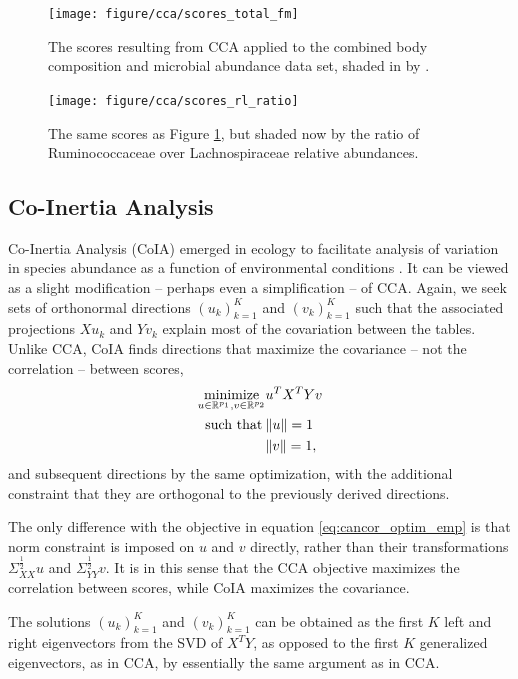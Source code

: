 \documentclass{article}
\begin{document}
\begin{figure}[ht]
  \centering
  \texttt{[image: figure/cca/scores\_total\_fm]}
  \caption{The scores resulting from CCA applied to the combined body
    composition and microbial abundance data set, shaded in by
    .\label{fig:cca_scores_total_fm} }
\end{figure}

\begin{figure}[ht]
  \centering
  \texttt{[image: figure/cca/scores\_rl\_ratio]}
  \caption{The same scores as Figure \ref{fig:cca_scores_total_fm}, but shaded now by
    the ratio of Ruminococcaceae over Lachnospiraceae relative
    abundances. \label{fig:cca_scores_rl_ratio} }
\end{figure}

\subsection{Co-Inertia Analysis}

Co-Inertia Analysis (CoIA) emerged in ecology to facilitate analysis of
variation in species abundance as a function of environmental conditions
\cite{doledec1994co}. It can be viewed as a slight modification -- perhaps even
a simplification -- of CCA. Again, we seek sets of orthonormal directions
$\left(u_{k}\right)_{k = 1}^{K}$ and $\left(v_{k}\right)_{k = 1}^{K}$ such that
the associated projections $Xu_{k}$ and $Yv_{k}$ explain most of the covariation
between the tables. Unlike CCA, CoIA finds directions that maximize the
covariance -- not the correlation -- between scores,
\begin{align*}
\mathop\mathrm{minimize}_{u \in \mathbb{R}^{p_{1}}, v \in \mathbb{R}^{p_{2}}} &u^{T}X^{T}Yv \\
\text{ such that}\medspace &\|u\| = 1\\
&\|v\| = 1,
\end{align*}
and subsequent directions by the same optimization, with the
additional constraint that they are orthogonal to the previously
derived directions.

The only difference with the objective in equation \ref{eq:cancor_optim_emp} is
that norm constraint is imposed on $u$ and $v$ directly, rather than their
transformations $\Sigma_{XX}^{\frac{1}{2}}u$ and $\Sigma_{YY}^{\frac{1}{2}}v$.
It is in this sense that the CCA objective maximizes the correlation between
scores, while CoIA maximizes the covariance.

The solutions $\left(u_{k}\right)_{k = 1}^{K}$ and $\left(v_{k}\right)_{k =
  1}^{K}$ can be obtained as the first $K$ left and right eigenvectors from the
SVD of $X^{T}Y$, as opposed to the first $K$ generalized eigenvectors, as in
CCA, by essentially the same argument as in CCA.
\end{document}
